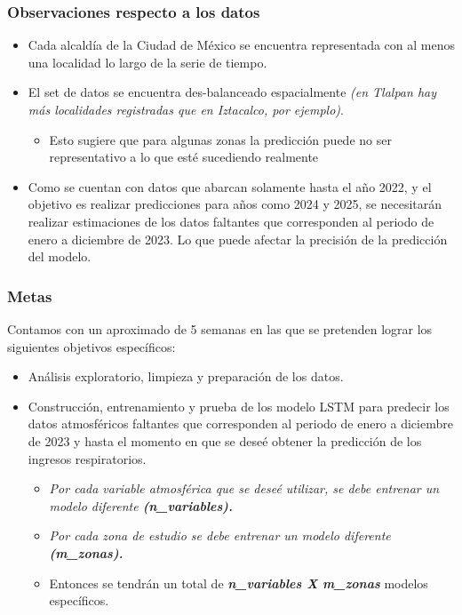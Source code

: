 \begin{frame}
	\frametitle{Observaciones respecto a los datos}
	\begin{itemize}
		
		\item Cada alcaldía de la Ciudad de México se encuentra representada con al menos una localidad lo largo de la serie de tiempo.
		
		\item El set de datos se encuentra des-balanceado espacialmente \textit{(en Tlalpan hay más localidades registradas que en Iztacalco, por ejemplo)}.
		
		\begin{itemize}
			\item Esto sugiere que para algunas zonas la predicción puede no ser representativo a lo que esté sucediendo realmente
		\end{itemize}
		
		\item Como se cuentan con datos que abarcan solamente hasta el año 2022, y el objetivo es realizar predicciones para años como 2024 y 2025, se necesitarán realizar estimaciones de los datos faltantes que corresponden al periodo de enero a diciembre de 2023. Lo que puede afectar la precisión de la predicción del modelo.
		
		
		
		
	\end{itemize}
	
\end{frame}

\begin{frame}
	\frametitle{Metas}
	
	Contamos con un aproximado de 5 semanas en las que se pretenden lograr los siguientes objetivos específicos:
	
	\begin{itemize}
		\item Análisis exploratorio, limpieza y preparación de los datos.
		\item Construcción, entrenamiento y prueba de los modelo LSTM para predecir los datos atmosféricos faltantes que corresponden al periodo de enero a diciembre de 2023 y hasta el momento en que se deseé obtener la predicción de los ingresos respiratorios.
		\begin{itemize}
			\item \textit{Por cada variable atmosférica que se deseé utilizar, se debe entrenar un modelo diferente \textbf{(n\_variables).}}
			\item \textit{Por cada zona de estudio se debe entrenar un modelo diferente \textbf{(m\_zonas).}}
			\item Entonces se tendrán un total de \textit{\textbf{n\_variables X m\_zonas}} modelos específicos.
		\end{itemize}
				
	\end{itemize}
	
\end{frame}

